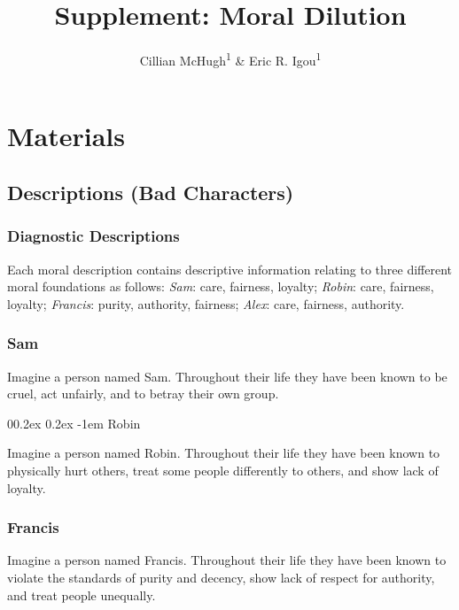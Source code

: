 \documentclass[
  man,floatsintext]{apa6}
\title{Supplement: Moral Dilution}
\author{Cillian McHugh\textsuperscript{1} \& Eric R. Igou\textsuperscript{1}}
\date{}
\affiliation{\vspace{0.5cm}\textsuperscript{1} University of Limerick}
\makeatletter
\let\oldparagraph\paragraph
\renewcommand{\paragraph}[1]{\oldparagraph{#1}\mbox{}}
\renewcommand{\paragraph}{\@startsection{paragraph}{4}{\parindent}%
  {0\baselineskip \@plus 0.2ex \@minus 0.2ex}%
  {-1em}%
  {\normalfont\normalsize\bfseries\itshape\typesectitle}}
\makeatother
\begin{document}
\maketitle

{
\setcounter{tocdepth}{1}
\tableofcontents
}
\pagebreak

\section{Materials}\label{materials}

\subsection{Descriptions (Bad Characters)}\label{descriptions-bad-characters}

\subsubsection{Diagnostic Descriptions}\label{diagnostic-descriptions}

Each moral description contains descriptive information relating to three different moral foundations as follows: \emph{Sam}: care, fairness, loyalty; \emph{Robin}: care, fairness, loyalty; \emph{Francis}: purity, authority, fairness; \emph{Alex}: care, fairness, authority.

\subsubsection{Sam}\label{sam}

Imagine a person named Sam.
Throughout their life they have been known to be cruel, act unfairly, and to betray their own group.

\paragraph{Robin}\label{robin}

Imagine a person named Robin.
Throughout their life they have been known to physically hurt others, treat some people differently to others, and show lack of loyalty.

\subsubsection{Francis}\label{francis}

Imagine a person named Francis.
Throughout their life they have been known to violate the standards of purity and decency, show lack of respect for authority, and treat people unequally.
\end{document}
